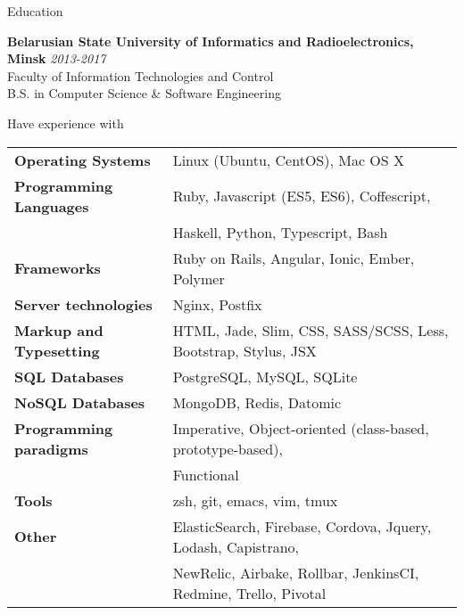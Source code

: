 \documentclass{resume} %
\begin{document}

\begin{rSection}{Education}

{\bf Belarusian State University of Informatics and Radioelectronics, Minsk} \hfill {\em 2013-2017} \\ 
Faculty of Information Technologies and Control \\
B.S. in Computer Science \& Software Engineering \\

\end{rSection}


\begin{rSection}{Have experience with}

\begin{tabular}{ @{} >{\bfseries}l @{\hspace{6ex}} l }
Operating Systems     & Linux (Ubuntu, CentOS), Mac OS X \smallskip \\
Programming Languages & Ruby, Javascript (ES5, ES6), Coffescript, \\
                      & Haskell, Python, Typescript, Bash \smallskip \\
Frameworks            & Ruby on Rails, Angular, Ionic, Ember, Polymer \smallskip \\
Server technologies   & Nginx, Postfix \smallskip \\
Markup and Typesetting & HTML, Jade, Slim, CSS, SASS/SCSS, Less, Bootstrap, Stylus, JSX \smallskip \\
SQL Databases & PostgreSQL, MySQL, SQLite \smallskip \\
NoSQL Databases & MongoDB, Redis, Datomic \smallskip \\
Programming paradigms & Imperative, Object-oriented (class-based, prototype-based), \\
                      & Functional \smallskip \\
Tools                 & zsh, git, emacs, vim, tmux \smallskip \\
Other                 & ElasticSearch, Firebase, Cordova, Jquery, Lodash, Capistrano, \\
                      & NewRelic, Airbake, Rollbar, JenkinsCI, Redmine, Trello, Pivotal
\end{tabular}

\end{rSection}
\end{document}
